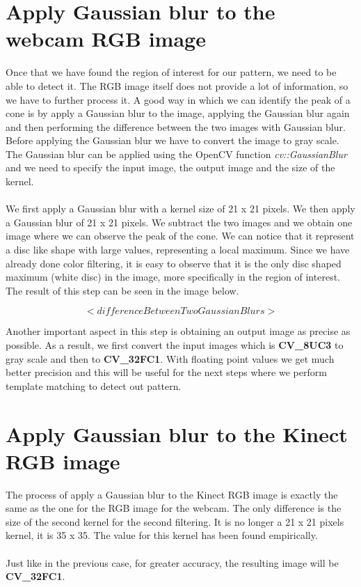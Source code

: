 \section{Apply Gaussian blur to the webcam RGB image}
\noindent
Once that we have found the region of interest for our pattern, we need to be able to detect it. The RGB image itself does not provide a lot of information, so we have to further process it. A good way in which we can identify the peak of a cone is by apply a Gaussian blur to the image, applying the Gaussian blur again and then performing the difference between the two images with Gaussian blur. Before applying the Gaussian blur we have to convert the image to gray scale.
\\
The Gaussian blur can be applied using the OpenCV function \emph{cv::GaussianBlur} and we need to specify the input image, the output image and the size of the kernel. 
\\\\
We first apply a Gaussian blur with a kernel size of 21 x 21 pixels. We then apply a Gaussian blur of 21 x 21 pixels. We subtract the two images and we obtain one image where we can observe the peak of the cone. We can notice that it represent a disc like shape with large values, representing a local maximum. Since we have already done color filtering, it is easy to observe that it is the only disc shaped maximum (white disc) in the image, more specifically in the region of interest.
The result of this step can be seen in the image below.

$$ <differenceBetweenTwoGaussianBlurs>$$

Another important aspect in this step is obtaining an output image as precise as possible. As a result, we first convert the input images which is {\bf CV\_8UC3} to gray scale and then to {\bf CV\_32FC1}. With floating point values we get much better precision and this will be useful for the next steps where we perform template matching to detect out pattern. 

\section{Apply Gaussian blur to the Kinect RGB image}
\noindent
The process of apply a Gaussian blur to the Kinect RGB image is exactly the same as the one for the RGB image for the webcam. The only difference is the size of the second kernel for the second filtering. It is no longer a 21 x 21 pixels kernel, it is 35 x 35. The value for this kernel has been found empirically. 
\\\\
Just like in the previous case, for greater accuracy, the resulting image will be {\bf CV\_32FC1}.

